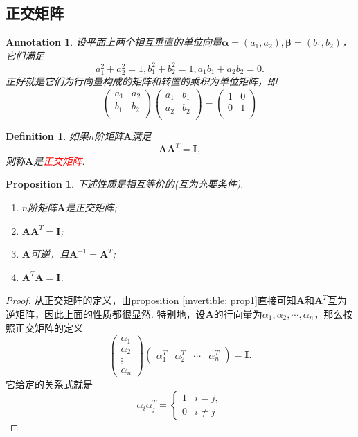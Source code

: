 \documentclass{article}
\newtheorem{proposition}[theorem]{Proposition}
\newtheorem{definition}[theorem]{Definition}
\newtheorem{annotation}[theorem]{Annotation}
\newcommand{\mbf}[1]{\bm{#1}}
\newcommand{\redt}[1]{\textcolor{red}{#1}}
\begin{document}
\subsection{正交矩阵}

\begin{annotation}
\rm 设平面上两个相互垂直的单位向量$\mbf{\alpha}=(a_1,a_2),\mbf{\beta}=(b_1,b_2)$，它们满足
$$
a_1^2+a_2^2 = 1, b_1^2+b_2^2 = 1, a_1b_1+a_2b_2 = 0.
$$
正好就是它们为行向量构成的矩阵和转置的乘积为单位矩阵，即
$$
\begin{pmatrix}
a_1 & a_2 \\
b_1 & b_2 \\
\end{pmatrix}
\begin{pmatrix}
a_1 & b_1 \\
a_2 & b_2 \\
\end{pmatrix} = \begin{pmatrix}
1 & 0 \\
0 & 1 \\
\end{pmatrix}
$$
\end{annotation}

\begin{definition}
\rm 如果$n$阶矩阵$\mbf{A}$满足
$$
\mbf{A}\mbf{A}^T = \mbf{I},
$$
则称$\mbf{A}$是\redt{正交矩阵}. 
\end{definition}


\begin{proposition}
\rm 下述性质是相互等价的(互为充要条件).
\begin{enumerate}
	\item $n$阶矩阵$\mbf{A}$是正交矩阵;
	\item $\mbf{A}\mbf{A}^T = \mbf{I}$;
	\item $\mbf{A}$可逆，且$\mbf{A}^{-1} = \mbf{A}^T$;
	\item $\mbf{A}^T\mbf{A} = \mbf{I}$. 
\end{enumerate}
\end{proposition}

\begin{proof}
从正交矩阵的定义，由proposition \ref{invertible: prop1}直接可知$\mbf{A}$和$\mbf{A}^T$互为逆矩阵，因此上面的性质都很显然. 特别地，设$\mbf{A}$的行向量为$\alpha_1,\alpha_2,\cdots,\alpha_n$，那么按照正交矩阵的定义
$$
\begin{pmatrix}
\alpha_1 \\
\alpha_2 \\
\vdots \\
\alpha_n 
\end{pmatrix}
\begin{pmatrix}
\alpha_1^T & \alpha_2^T & \cdots & \alpha_n^T
\end{pmatrix} = \mbf{I}.
$$
它给定的关系式就是
$$
\alpha_i\alpha_j^T = \left\{ 
\begin{array}{ll}
1 & i=j,\\
0 & i\neq j
\end{array}
\right.
$$
\end{proof}
\end{document}

